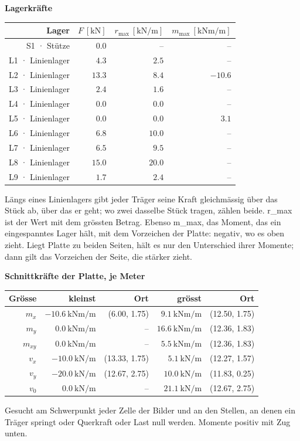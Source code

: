 \documentclass[11pt,a4paper]{article}
\begin{document}
\noindent\textbf{Lagerkräfte}
\begin{longtable}{rrrr}
\hline
Lager & $F\ [\mathrm{kN}]$ & $r_{\max}\ [\mathrm{kN/m}]$ & $m_{\max}\ [\mathrm{kNm/m}]$ \\
\hline
\endhead
S1 · Stütze & $0.0$ & – & – \\
L1 · Linienlager & $4.3$ & $2.5$ & – \\
L2 · Linienlager & $13.3$ & $8.4$ & $-10.6$ \\
L3 · Linienlager & $2.4$ & $1.6$ & – \\
L4 · Linienlager & $0.0$ & $0.0$ & – \\
L5 · Linienlager & $0.0$ & $0.0$ & $3.1$ \\
L6 · Linienlager & $6.8$ & $10.0$ & – \\
L7 · Linienlager & $6.5$ & $9.5$ & – \\
L8 · Linienlager & $15.0$ & $20.0$ & – \\
L9 · Linienlager & $1.7$ & $2.4$ & – \\
\hline
\end{longtable}
Längs eines Linienlagers gibt jeder Träger seine Kraft gleichmässig über das Stück ab, über das er geht; wo zwei dasselbe Stück tragen, zählen beide. r\_max ist der Wert mit dem grössten Betrag. Ebenso m\_max, das Moment, das ein eingespanntes Lager hält, mit dem Vorzeichen der Platte: negativ, wo es oben zieht. Liegt Platte zu beiden Seiten, hält es nur den Unterschied ihrer Momente; dann gilt das Vorzeichen der Seite, die stärker zieht.

\noindent\textbf{Schnittkräfte der Platte, je Meter}
\begin{longtable}{rrrrr}
\hline
Grösse & kleinst & Ort & grösst & Ort \\
\hline
\endhead
$m_x$ & $-10.6\ \mathrm{kNm/m}$ & (6.00, 1.75) & $9.1\ \mathrm{kNm/m}$ & (12.50, 1.75) \\
$m_y$ & $0.0\ \mathrm{kNm/m}$ & – & $16.6\ \mathrm{kNm/m}$ & (12.36, 1.83) \\
$m_{xy}$ & $0.0\ \mathrm{kNm/m}$ & – & $5.5\ \mathrm{kNm/m}$ & (12.36, 1.83) \\
$v_x$ & $-10.0\ \mathrm{kN/m}$ & (13.33, 1.75) & $5.1\ \mathrm{kN/m}$ & (12.27, 1.57) \\
$v_y$ & $-20.0\ \mathrm{kN/m}$ & (12.67, 2.75) & $10.0\ \mathrm{kN/m}$ & (11.83, 0.25) \\
$v_0$ & $0.0\ \mathrm{kN/m}$ & – & $21.1\ \mathrm{kN/m}$ & (12.67, 2.75) \\
\hline
\end{longtable}
Gesucht am Schwerpunkt jeder Zelle der Bilder und an den Stellen, an denen ein Träger springt oder Querkraft oder Last null werden. Momente positiv mit Zug unten.
\end{document}
